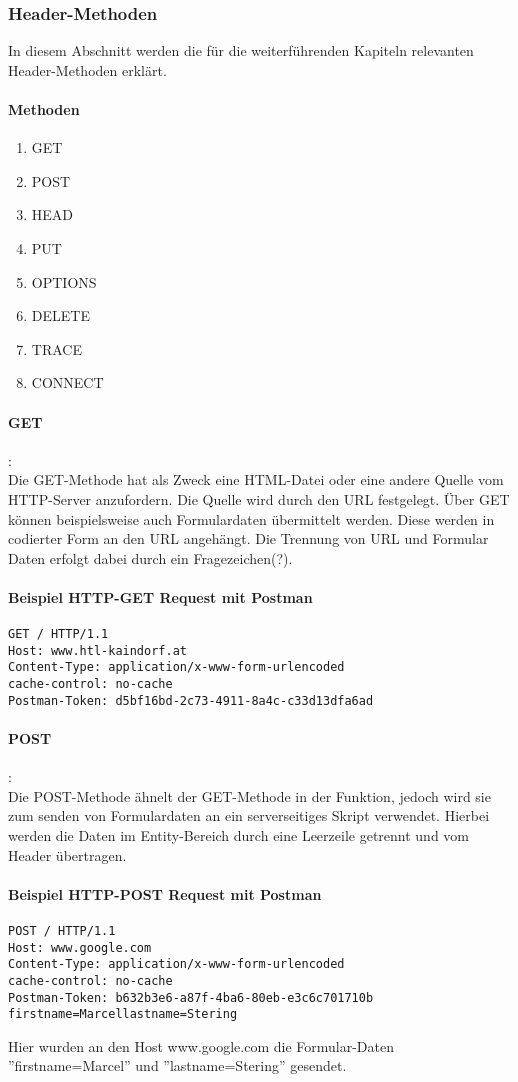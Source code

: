 \subsubsection{Header-Methoden}
In diesem Abschnitt werden die für die weiterführenden Kapiteln relevanten Header-Methoden erklärt.
\paragraph{Methoden}
\begin{enumerate}
\item GET
\item POST
\item HEAD
\item PUT
\item OPTIONS
\item DELETE
\item TRACE
\item CONNECT
\end{enumerate}
\paragraph{GET}:\\Die GET-Methode hat als Zweck eine HTML-Datei oder eine andere Quelle vom HTTP-Server anzufordern. Die Quelle wird durch den URL festgelegt. Über GET können beispielsweise auch Formulardaten übermittelt werden. Diese werden in codierter Form an den URL angehängt. Die Trennung von URL und Formular Daten erfolgt dabei durch ein Fragezeichen(?).
\paragraph{Beispiel HTTP-GET Request mit Postman}
\begin{lstlisting}[caption={HTTP GET}]
GET / HTTP/1.1
Host: www.htl-kaindorf.at
Content-Type: application/x-www-form-urlencoded
cache-control: no-cache
Postman-Token: d5bf16bd-2c73-4911-8a4c-c33d13dfa6ad
\end{lstlisting}
\paragraph{POST}:\\Die POST-Methode ähnelt der GET-Methode in der Funktion, jedoch wird sie zum senden von Formulardaten an ein serverseitiges Skript verwendet. Hierbei werden die Daten im Entity-Bereich durch eine Leerzeile getrennt und vom Header übertragen.
\paragraph{Beispiel HTTP-POST Request mit Postman}
\begin{lstlisting}[caption={HTTP POST}]
POST / HTTP/1.1
Host: www.google.com
Content-Type: application/x-www-form-urlencoded
cache-control: no-cache
Postman-Token: b632b3e6-a87f-4ba6-80eb-e3c6c701710b
firstname=Marcellastname=Stering
\end{lstlisting}
Hier wurden an den Host www.google.com die Formular-Daten ''firstname=Marcel'' und ''lastname=Stering'' gesendet.
